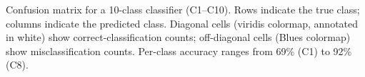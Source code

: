 \caption{Confusion matrix for a 10-class classifier (C1--C10). Rows indicate the true class; columns indicate the predicted class. Diagonal cells (viridis colormap, annotated in white) show correct-classification counts; off-diagonal cells (Blues colormap) show misclassification counts. Per-class accuracy ranges from 69\% (C1) to 92\% (C8).}
